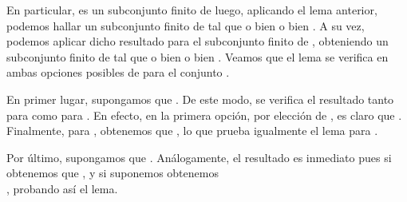 \begin{isabellebody}
\begin{isamarkuptext}
\begin{demostracion}
  En particular,  es un subconjunto finito de  luego, aplicando el lema 
  anterior, podemos hallar un subconjunto finito  de  tal que o bien  o 
  bien . A su vez, podemos aplicar dicho resultado para el subconjunto finito  de 
  , obteniendo un subconjunto finito  de  tal que o bien  o bien 
  . Veamos que el lema se verifica en ambas opciones posibles de  para el conjunto 
  .

  En primer lugar, supongamos que . De este modo, se verifica el resultado tanto para
   como para . En efecto, en la primera opción, por elección de , es claro
  que . Finalmente, para , obtenemos que , lo que prueba
  igualmente el lema para .

  Por último, supongamos que . Análogamente, el resultado es inmediato pues si 
   obtenemos que , y si suponemos  obtenemos\\ , probando
  así el lema.
\end{demostracion}


\end{isamarkuptext}
\end{isabellebody}
